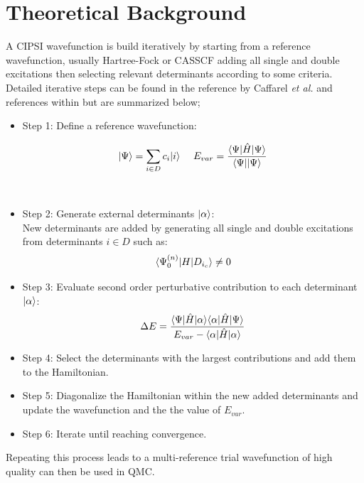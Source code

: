 \section{Theoretical Background}
A CIPSI wavefunction is build iteratively by starting from a reference wavefunction, usually Hartree-Fock or CASSCF adding all single and double excitations then selecting relevant determinants according to some criteria. Detailed iterative steps can be found in the reference by Caffarel \textit{et al.} and references within\cite{Caffarel2013, Scemama2016,Scemama2018,Garniron2017-2} but are summarized below; 
\begin{itemize}
\item Step 1: Define a reference wavefunction:

    \begin{equation}
     \begin{gathered}
       \begin{aligned}
         \ket{\Psi}&=\sum_{i\in D} c_i\ket{i} \,         \,
         &E_{var}&= \frac{\bra{\Psi}\hat{H}\ket{\Psi}}{\bra{\Psi}\ket{\Psi}} \\[12pt]
       \end{aligned} \\[12pt]
     \end{gathered}
   \end{equation}

 
 \item Step 2: Generate external determinants $\ket{\alpha}$:\\
New determinants are added by generating all single and double excitations from determinants $i \in D$ such as:\\ 
\begin{equation}
\bra{\Psi_0^{(n)}}H\ket{D_{i_c}}\neq 0
\end{equation}

\item Step 3: Evaluate second order perturbative contribution to each determinant $\ket{\alpha}$:
\begin{equation}
\Delta E=\frac{\bra{\Psi}\hat{H}\ket{\alpha}\bra{\alpha}\hat{H}\ket{\Psi}}{E_{var}-\bra{\alpha}\hat{H}\ket{\alpha}}
\end{equation}

\item Step 4: Select the determinants with the largest contributions and add them to the Hamiltonian.
\item Step 5: Diagonalize the Hamiltonian within the new added determinants and update the wavefunction and the the value of $E_{var}$.
\item Step 6: Iterate until reaching convergence.\\
\end{itemize}
Repeating this process leads to a multi-reference trial wavefunction of high quality can then be used in QMC. 

